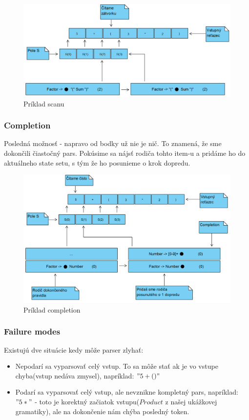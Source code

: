 \documentclass[12pt,a4paper]{report}
\theoremstyle{definition}
\theoremstyle{remark}
\begin{document}
\begin{figure}[h]
\centering
\includegraphics[scale=0.7]{scan}
\caption{Príklad scanu}
\end{figure}

\subsubsection*{Completion}
Posledná možnosť - napravo od bodky už nie je nič. To znamená, že sme dokončili čiastočný pars. Pokúsime sa nájsť rodiča tohto item-u a pridáme ho do aktuálneho state setu, s tým že ho posunieme o krok dopredu.

\begin{figure}[H]
\includegraphics[scale=0.7]{completition}
\caption{Príklad completion}
\end{figure}

\subsubsection*{Failure modes} 
Existujú dve situácie kedy môže parser zlyhať:
\begin{itemize}
\item Nepodarí sa vyparsovať celý vstup. To sa môže stať ak je vo vstupe chyba(vstup nedáva zmysel), napríklad: $"5 + ()"$
\item Podarí sa vyparsovať celý vstup, ale nevznikne kompletný pars, napríklad: $"5 *"$ - toto je korektný začiatok vstupu($Product$ z našej ukážkovej gramatiky), ale na dokončenie nám chýba posledný token.
\end{itemize}
\end{document}

